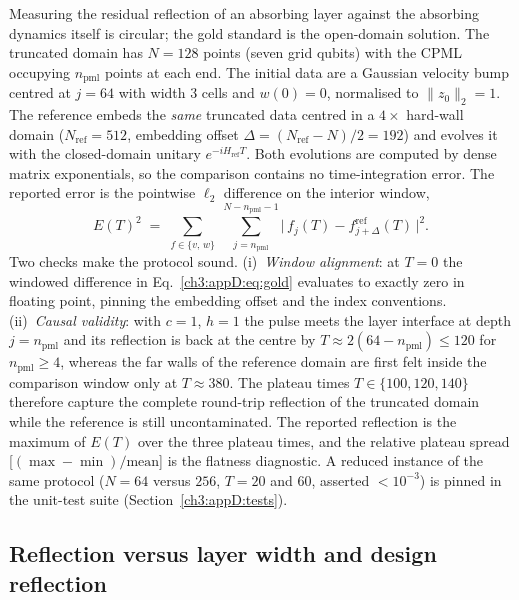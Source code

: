 Measuring the residual reflection of an absorbing layer against the
absorbing dynamics itself is circular; the gold standard is the
open-domain solution.  The truncated domain has $N=128$ points (seven
grid qubits) with the CPML occupying $n_{\mathrm{pml}}$ points at each
end.  The initial data are a Gaussian velocity bump centred at $j=64$
with width $3$ cells and $w(0)=0$, normalised to
$\lVert z_0\rVert_2=1$.  The reference embeds the \emph{same} truncated
data centred in a $4\times$ hard-wall domain ($N_{\mathrm{ref}}=512$,
embedding offset $\Delta=(N_{\mathrm{ref}}-N)/2=192$) and evolves it
with the closed-domain unitary $e^{-iH_{\mathrm{ref}}T}$.  Both
evolutions are computed by dense matrix exponentials, so the comparison
contains no time-integration error.  The reported error is the
pointwise $\ell_2$ difference on the interior window,
\begin{equation}
  E(T)^{2} \;=\; \sum_{f\in\{v,\,w\}}\;
  \sum_{j=n_{\mathrm{pml}}}^{N-n_{\mathrm{pml}}-1}
  \bigl|\, f_j(T) - f^{\mathrm{ref}}_{j+\Delta}(T) \,\bigr|^{2}.
  \label{ch3:appD:eq:gold}
\end{equation}
Two checks make the protocol sound.  (i)~\emph{Window alignment}: at
$T=0$ the windowed difference in Eq.~\eqref{ch3:appD:eq:gold} evaluates to
exactly zero in floating point, pinning the embedding offset and the
index conventions.  (ii)~\emph{Causal validity}: with $c=1$, $h=1$ the
pulse meets the layer interface at depth $j=n_{\mathrm{pml}}$ and its
reflection is back at the centre by
$T\approx2(64-n_{\mathrm{pml}})\le120$ for $n_{\mathrm{pml}}\ge4$,
whereas the far walls of the reference domain are first felt inside the
comparison window only at $T\approx380$.  The plateau times
$T\in\{100,120,140\}$ therefore capture the complete round-trip
reflection of the truncated domain while the reference is still
uncontaminated.  The reported reflection is the maximum of $E(T)$ over
the three plateau times, and the relative plateau spread
[$(\max-\min)/\mathrm{mean}$] is the flatness diagnostic.  A reduced
instance of the same protocol ($N=64$ versus $256$, $T=20$ and $60$,
asserted $<10^{-3}$) is pinned in the unit-test suite
(Section~\ref{ch3:appD:tests}).

\subsection{Reflection versus layer width and design reflection}
\label{ch3:appD:reflection}

